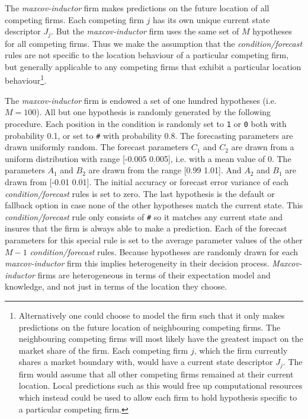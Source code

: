 \documentclass[preprint, 12pt]{elsarticle}
\begin{document}
The \emph{maxcov-inductor} firm makes predictions on the future location of all competing firms. Each competing firm $j$ has its own unique current state descriptor $J_j$. But the \emph{maxcov-inductor} firm uses the same set of $M$ hypotheses for all competing firms. Thus we make the assumption that the \emph{condition/forecast} rules are not specific to the location behaviour of a particular competing firm, but generally applicable to any competing firms that exhibit a particular location behaviour\footnote{Alternatively one could choose to model the firm such that it only makes predictions on the future location of neighbouring competing firms. The neighbouring competing firms will most likely have the greatest impact on the market share of the firm. Each competing firm $j$, which the firm currently shares a market boundary with, would have a current state descriptor $J_j$. The firm would assume that all other competing firms remained at their current location. Local predictions such as this would free up computational resources which instead could be used to allow each firm to hold hypothesis specific to a particular competing firm.}. 

The \emph{maxcov-inductor} firm is endowed a set of one hundred hypotheses (i.e. $M=100$). All but one hypothesis is randomly generated by the following procedure. Each position in the condition is randomly set to \texttt{1} or \texttt{0} both with probability 0.1, or set to \texttt{\#} with probability 0.8. The forecasting parameters are drawn uniformly random. The forecast parameters $C_1$ and $C_2$ are drawn from a uniform distribution with range [-0.005 0.005], i.e. with a mean value of 0. The parameters $A_1$ and $B_2$ are drawn from the range [0.99 1.01]. And $A_2$ and $B_1$ are drawn from [-0.01 0.01]. The initial accuracy or forecast error variance of each \emph{condition/forecast} rules is set to zero. The last hypothesis is the default or fallback option in case none of the other hypotheses match the current state. This \emph{condition/forecast} rule only consists of \texttt{\#} so it matches any current state and insures that the firm is always able to make a prediction. Each of the forecast parameters for this special rule is set to the average parameter values of the other $M-1$ \emph{condition/forecast} rules. Because hypotheses are randomly drawn for each \emph{maxcov-inductor} firm this implies heterogeneity in their decision process. \emph{Maxcov-inductor} firms are heterogeneous in terms of their expectation model and knowledge, and not just in terms of the location they choose.
\end{document}
